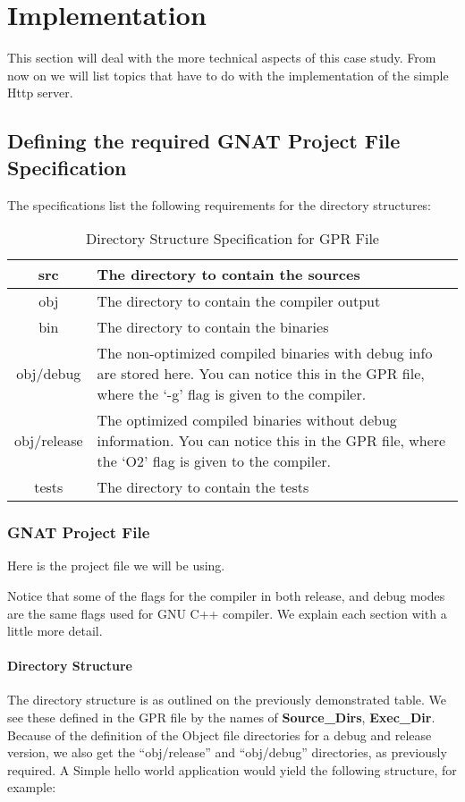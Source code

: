 \section{Implementation}
This section will deal with the more technical aspects of this case study. From now on we will list topics that have to do with the implementation of the simple Http server.

\subsection{Defining the required GNAT Project File Specification}
The specifications list the following requirements for the directory structures: 
\begin{table}
\begin{center}
\begin{tabular}{|c|l|}
\hline
src & The directory to contain the sources \\ \hline
obj & The directory to contain the compiler output \\ \hline
bin & The directory to contain the binaries \\ \hline
obj/debug & \parbox{10cm}{The non-optimized compiled binaries with debug info are stored here. You can notice this in the GPR file, where the `-g' flag is given to the compiler.} \\ \hline
obj/release &  \parbox{10cm}{The optimized compiled binaries without debug information. You  can notice this in the GPR file, where the `O2' flag is given to the compiler.} \\ \hline
tests & The directory to contain the tests \\ \hline
\end{tabular}\end{center}
\caption{Directory Structure Specification for GPR File}
\end{table}
\subsubsection{GNAT Project File}
Here is the project file we will be using.

Notice that some of the flags for the compiler in both release, and debug modes are the same flags used for GNU C++ compiler. We explain each section with a little more detail.

\paragraph{Directory Structure}The directory structure is as outlined on the previously demonstrated table. We see these defined in the GPR file by the names of \textbf{Source\_Dirs}, \textbf{Exec\_Dir}. Because of the definition of the Object file directories for a debug and release version, we also get the ``obj/release'' and ``obj/debug'' directories, as previously required. A Simple hello world application would yield the following structure, for example: 

